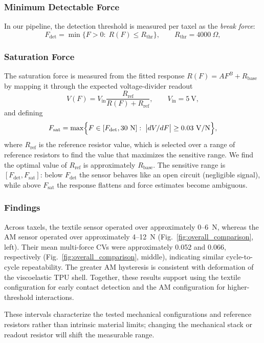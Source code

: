 \subsubsection{Minimum Detectable Force}
In our pipeline, the detection threshold is measured per taxel as the \emph{break force}:
\[
F_{\mathrm{det}}=\min\{F>0:\; R(F)\le R_{\mathrm{thr}}\},\qquad R_{\mathrm{thr}}=4000~\Omega,
\]

\subsubsection{Saturation Force}
The saturation force is measured from the fitted response $R(F)=AF^B+R_{\mathrm{base}}$ by mapping it through the expected voltage-divider readout
\[
V(F)=V_{\mathrm{in}}\frac{R_{\mathrm{ref}}}{R(F)+R_{\mathrm{ref}}},\qquad V_{\mathrm{in}}=5~\mathrm{V},
\]
and defining
\[
F_{\mathrm{sat}}=\max\Bigl\{F\in[F_{\mathrm{det}},30~\mathrm{N}]:\; \bigl|dV/dF\bigr|\ge 0.03~\mathrm{V/N}\Bigr\},
\]
where $R_{\mathrm{ref}}$ is the reference resistor value, which is selected over a range of reference resistors to find the value that maximizes the sensitive range. We find the optimal value of $R_{\mathrm{ref}}$ is approximately $ R_{\mathrm{base}}$. The sensitive range is $[F_{\mathrm{det}},F_{\mathrm{sat}}]$: below $F_{\mathrm{det}}$ the sensor behaves like an open circuit (negligible signal), while above $F_{\mathrm{sat}}$ the response flattens and force estimates become ambiguous.

\subsubsection{Findings}

Across taxels, the textile sensor operated over approximately 0--6~N, whereas the AM sensor operated over approximately 4--12~N (Fig.~\ref{fig:overall_comparison}, left). Their mean multi-force CVs were approximately 0.052 and 0.066, respectively (Fig.~\ref{fig:overall_comparison}, middle), indicating similar cycle-to-cycle repeatability. The greater AM hysteresis is consistent with deformation of the viscoelastic TPU shell. Together, these results support using the textile configuration for early contact detection and the AM configuration for higher-threshold interactions.

These intervals characterize the tested mechanical configurations and reference resistors rather than intrinsic material limits; changing the mechanical stack or readout resistor will shift the measurable range.

